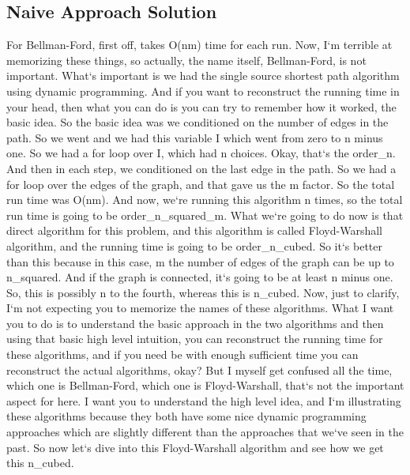 \subsection{Naive Approach Solution}
For Bellman-Ford, first off, takes O(nm) time for each run.
Now, I`m terrible at memorizing these things, so actually, the name itself, Bellman-Ford, is not important.
What`s important is we had the single source shortest path algorithm using dynamic programming.
And if you want to reconstruct the running time in your head, then what you can do is you can try to remember how it worked, the basic idea.
So the basic idea was we conditioned on the number of edges in the path.
So we went and we had this variable I which went from zero to n minus one.
So we had a for loop over I, which had n choices.
Okay, that`s the order\_n.
And then in each step, we conditioned on the last edge in the path.
So we had a for loop over the edges of the graph, and that gave us the m factor.
So the total run time was O(nm).
And now, we`re running this algorithm n times, so the total run time is going to be order\_n\_squared\_m.
What we`re going to do now is that direct algorithm for this problem, and this algorithm is called Floyd-Warshall algorithm, and the running time is going to be order\_n\_cubed.
So it`s better than this because in this case, m the number of edges of the graph can be up to n\_squared.
And if the graph is connected, it`s going to be at least n minus one.
So, this is possibly n to the fourth, whereas this is n\_cubed.
Now, just to clarify, I`m not expecting you to memorize the names of these algorithms.
What I want you to do is to understand the basic approach in the two algorithms and then using that basic high level intuition, you can reconstruct the running time for these algorithms, and if you need be with enough sufficient time you can reconstruct the actual algorithms, okay? But I myself get confused all the time, which one is Bellman-Ford, which one is Floyd-Warshall, that`s not the important aspect for here.
I want you to understand the high level idea, and I`m illustrating these algorithms because they both have some nice dynamic programming approaches which are slightly different than the approaches that we`ve seen in the past.
So now let`s dive into this Floyd-Warshall algorithm and see how we get this n\_cubed.


